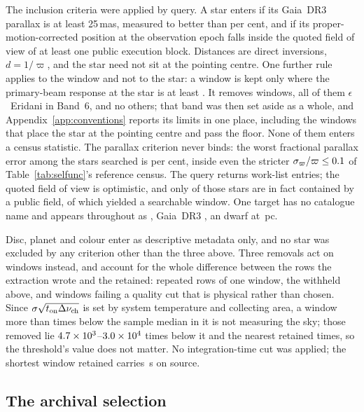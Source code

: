 The inclusion criteria were applied by query. A star enters
if its Gaia~DR3 parallax is at least 25\,mas, measured to better than
\PlxAdqlPct{} per cent, and if its proper-motion-corrected position at the
observation epoch falls inside the quoted field of view of at least one
public execution block. Distances are direct inversions, $d=1/\varpi$, and
the star need not sit at the pointing centre. One further rule applies to the
window and not to the star: a window is kept only where the primary-beam
response at the star is at least \PbFloorResp. It removes \EpsEriNOffAxis{}
windows, all of them $\epsilon$~Eridani in Band~6, and no others; that band
was then set aside as a whole, and Appendix~\ref{app:conventions} reports its
limits in one place, including the \EpsEriNOnAxis{} windows that place the
star at the pointing centre and pass the floor. None of them enters a census
statistic. The parallax
criterion never binds: the worst fractional parallax error among the stars
searched is \SfPlxWorstPct{} per cent, inside even the stricter
$\sigma_\varpi/\varpi\le0.1$ of Table~\ref{tab:selfunc}'s
reference census. The query returns
\NCensus{} work-list entries; the quoted field of view is optimistic, and
only \NGenuinelyCovered{} of those stars are in fact contained by a public
field, of which \NStars{} yielded a searchable window. One target has no
catalogue name and appears throughout as \BkAlmaName, Gaia~DR3
\BkAlmaGaia, an \BkAlmaSpType{} dwarf at \BkAlmaDistPc\,pc.

Disc, planet and colour enter as descriptive metadata only, and no
star was excluded by any criterion other than the three above. Three removals
act on windows instead, and account for the whole difference between the
\LqNExport{} rows the extraction wrote and the \NWindows{} retained:
\NDup{} repeated rows of one window, the \NWithheld{} withheld above, and
\NDefect{} windows failing a quality cut that is physical rather than chosen.
Since $\sigma\sqrt{t_{\rm on}\Delta\nu_{\rm ch}}$ is set by system
temperature and collecting area, a window more than \LqDefectCut{} times
below the sample median in it is not measuring the sky; those removed lie
$4.7\times10^{3}$--$3.0\times10^{4}$ times below it and the nearest retained
\LqKeptFac{} times, so the threshold's value does not matter. No
integration-time cut was applied; the shortest window retained carries
\LqOnsrcMin\,s on source.

\subsection{The archival selection}
\label{sec:bias}

